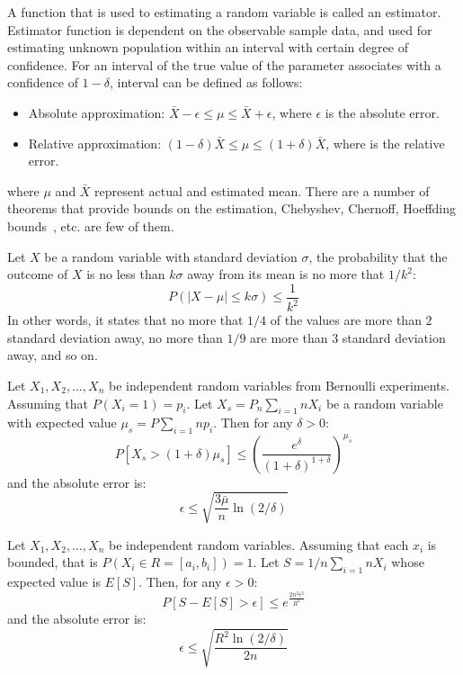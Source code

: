A function that is used to estimating a random variable is called an estimator. Estimator function is dependent on the observable sample data, and used for estimating unknown population within an interval with certain degree of confidence. For an interval of the true value of the parameter associates with a confidence of $1 - \delta$, interval can be defined as follows:

\begin{itemize}    
    \item Absolute approximation: $\bar{X} - \epsilon \le \mu \le \bar{X} + \epsilon$, where $\epsilon$ is the absolute error.
    \item Relative approximation: $(1 - \delta)\bar{X} \le \mu \le (1 + \delta)\bar{X}$, where  is the relative error.
\end{itemize}

where $\mu$ and $\bar{X}$ represent actual and estimated mean. There are a number of theorems that provide bounds on the estimation, Chebyshev, Chernoff, Hoeffding bounds~\cite{hoeffding63:bound}, etc. are few of them.

\begin{theorem}
\label{thm:chebyshev}
    Let $X$ be a random variable with standard deviation $\sigma$, the probability that the outcome of $X$ is no less than $k\sigma$ away from its mean is no more that $1/k^2$:
    \[
        P(|X-\mu| \le k\sigma) \le \frac{1}{k^2}
    \]
    In other words, it states that no more that $1/4$ of the values are more than $2$ standard deviation away, no more than $1/9$ are more than $3$ standard deviation away, and so on.
\end{theorem}

\begin{theorem}
\label{thm:chernoff}
    Let $X_1,X_2,\dots, X_n$ be independent random variables from Bernoulli experiments. Assuming that $P(X_i = 1) = p_i$. Let $X_s = P_n \sum_{i=1}{n} X_i$ be a random variable with expected value $\mu_s = P \sum_{i=1} np_i$. Then for any $\delta > 0$:
    \[
        P[X_s > (1+\delta) \mu_s] \le (\frac{e^\delta}{(1 + \delta)^{1 +\delta}} )  ^{\mu_s}
    \]
    and the absolute error is:
    \[
        \epsilon \le \sqrt{\frac{3 \bar{\mu}}{n} \ln (2/\delta)}
    \]
\end{theorem}

\begin{theorem}
\label{thm:hoeffding}
    Let $X_1,X_2,\dots, X_n$ be independent random variables. Assuming that each $x_i$ is bounded, that is $P(X_i \in R = [a_i, b_i]) = 1$. Let $S = 1/n \sum_{i=1}{n} X_i$ whose expected value is $E[S]$. Then, for any $\epsilon > 0$:
    \[
        P[S - E[S] > \epsilon] \le e^{ \frac{2 n^2 \epsilon^2}{R^2} }
    \]
    and the absolute error is:
    \[
        \epsilon \le \sqrt{\frac{R^2 \ln(2/\delta)}{2n}}
    \]
\end{theorem}

